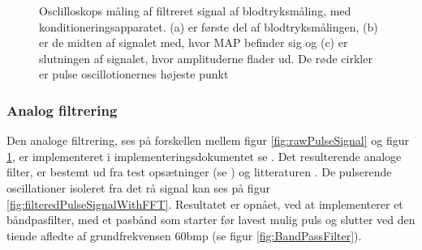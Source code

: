 \begin{figure}[H]
	\centering
	\caption{Osclilloskops måling af filtreret signal af blodtryksmåling, med konditioneringsapparatet. (a) er første del af blodtryksmålingen, (b) er de midten af signalet med, hvor MAP befinder sig og (c) er slutningen af signalet, hvor amplituderne flader ud. De røde cirkler er pulse oscillotionernes højeste punkt}\label{fig:filteredPulseSignal}
\end{figure}

\subsubsection{Analog filtrering}
Den analoge filtrering, ses på forskellen mellem figur \ref{fig:rawPulseSignal} og figur \ref{fig:filteredPulseSignal}, er implementeret i implementeringsdokumentet se . 
Det resulterende analoge filter, er bestemt ud fra test opsætninger (se ) og litteraturen . De pulserende oscillationer isoleret fra det rå signal kan ses på figur \ref{fig:filteredPulseSignalWithFFT}. Resultatet er opnået, ved at implementerer et båndpasfilter, med et pasbånd som starter før lavest mulig puls og slutter ved den tiende afledte af grundfrekvensen 60bmp (se figur \ref*{fig:BandPassFilter}).

